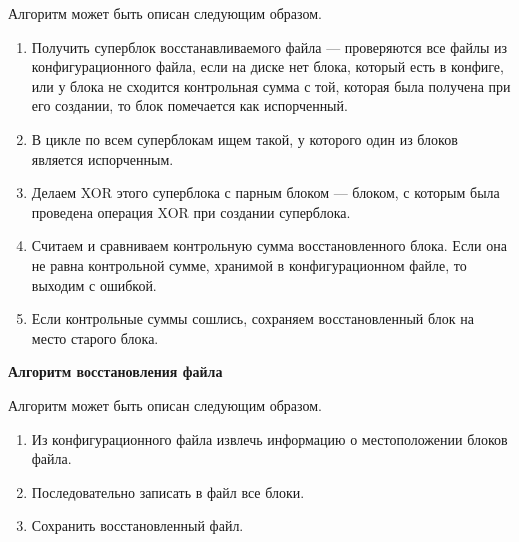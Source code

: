 \begin{flushleft}
Алгоритм может быть описан следующим образом.
\end{flushleft}
\begin{enumerate}
\item Получить суперблок восстанавливаемого файла --- проверяются все файлы из конфигурационного файла, если на диске нет блока, который есть в конфиге, или у блока не сходится контрольная сумма с той, которая была получена при его создании, то блок помечается как испорченный.

\item В цикле по всем суперблокам ищем такой, у которого один из блоков является испорченным.

\item Делаем XOR этого суперблока с парным блоком --- блоком, с которым была проведена операция XOR при создании суперблока.  

\item Считаем и сравниваем контрольную сумма восстановленного блока. Если она не равна контрольной сумме, хранимой в конфигурационном файле, то выходим с ошибкой. 

\item Если контрольные суммы сошлись, сохраняем восстановленный блок на место старого блока.  
\end{enumerate}
\textbf{Алгоритм восстановления файла}

\begin{flushleft}
Алгоритм может быть описан следующим образом.
\end{flushleft}

\begin{enumerate}
\item Из конфигурационного файла извлечь информацию о местоположении блоков файла.

\item Последовательно записать в файл все блоки.

\item Сохранить восстановленный файл.  

\end{enumerate}

%
%

